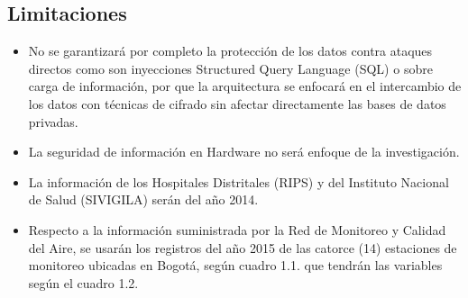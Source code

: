\documentclass[a4paper,openright,12pt]{book}
\theoremstyle{definition}
\theoremstyle{remark}
\begin{document}
\subsection{Limitaciones}

\begin{itemize}
\item No se garantizará por completo la protección de los datos contra ataques directos como son inyecciones Structured Query Language (SQL) o sobre carga de información, por que la arquitectura se enfocará en el intercambio de los datos con técnicas de cifrado sin afectar directamente las bases de datos privadas. 
\item La seguridad de información en Hardware no será enfoque de la investigación.
\item La información de los Hospitales Distritales (RIPS) y del Instituto Nacional de Salud (SIVIGILA) serán del año 2014.
\item Respecto a la información suministrada por la Red de Monitoreo y Calidad del Aire, se usarán los registros del año 2015 de las catorce (14) estaciones de monitoreo ubicadas en Bogotá, según cuadro 1.1. que tendrán las variables según el cuadro 1.2.
\end{itemize}
\end{document}
